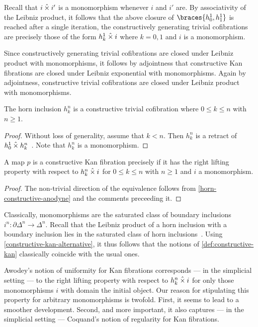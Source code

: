 \documentclass[reqno,10pt,a4paper,oneside]{amsart}
\begin{document}
Recall that $i \mathbin{\hat{\times}} i'$ is a monomorphism whenever $i$ and $i'$ are.
By associativity of the Leibniz product, it follows that the above closure of $\braces{h_0^1, h_1^1}$ is reached after a single iteration, \ie the constructively generating trivial cofibrations are precisely those of the form $h_k^1 \mathbin{\hat{\times}} i$ where $k = 0, 1$ and $i$ is a monomorphism.

Since constructively generating trivial cofibrations are closed under Leibniz product with monomorphisms, it follows by adjointness that constructive Kan fibrations are closed under Leibniz exponential with monomorphisms.
Again by adjointness, constructive trivial cofibrations are closed under Leibniz product with monomorphisms.

\begin{lemma}
\label{horn-constructive-anodyne}
The horn inclusion $h_k^n$ is a constructive trivial cofibration where $0 \leq k \leq n$ with $n \geq 1$.
\end{lemma}

\begin{proof}
Without loss of generality, assume that $k < n$.
Then $h_k^n$ is a retract of $h_0^1 \mathbin{\hat{\times}} h_k^n$~\cite[Proposition~2.1.2.6]{lurie:htt}.
Note that $h_k^n$ is a monomorphism.
\end{proof}

\begin{proposition}
\label{constructive-kan-alternative}
A map $p$ is a constructive Kan fibration precisely if it has the right lifting property with respect to $h_k^n \mathbin{\hat{\times}} i$ for $0 \leq k \leq n$ with $n \geq 1$ and $i$ a monomorphism.
\end{proposition}

\begin{proof}
The non-trivial direction of the equivalence follows from \cref{horn-constructive-anodyne} and the comments preceeding it.
\end{proof}

Classically, monomorphisms are the saturated class of boundary inclusions $i^n : \partial \Delta^n \to \Delta^n$.
Recall that the Leibniz product of a horn inclusion with a boundary inclusion lies in the saturated class of horn inclusions~\cite[Proposition~2.1.2.6]{lurie:htt}.
Using \cref{constructive-kan-alternative}, it thus follows that the notions of \cref{def:constructive-kan} classically coincide with the usual ones.

Awodey's notion of uniformity for Kan fibrations corresponds --- in the simplicial setting --- to the right lifting property with respect to $h_k^n \mathbin{\hat{\times}} i$ for only those monomorphisms $i$ with domain the initial object.
Our reason for stipulating this property for arbitrary monomorphisms is twofold.
First, it seems to lead to a smoother development.
Second, and more important, it also captures --- in the simplicial setting --- Coquand's notion of regularity for Kan fibrations.
\end{document}
